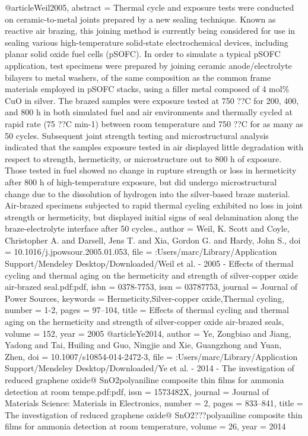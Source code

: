 @article{Weil2005,
abstract = {Thermal cycle and exposure tests were conducted on ceramic-to-metal joints prepared by a new sealing technique. Known as reactive air brazing, this joining method is currently being considered for use in sealing various high-temperature solid-state electrochemical devices, including planar solid oxide fuel cells (pSOFC). In order to simulate a typical pSOFC application, test specimens were prepared by joining ceramic anode/electrolyte bilayers to metal washers, of the same composition as the common frame materials employed in pSOFC stacks, using a filler metal composed of 4 mol{\%} CuO in silver. The brazed samples were exposure tested at 750 ??C for 200, 400, and 800 h in both simulated fuel and air environments and thermally cycled at rapid rate (75 ??C min-1) between room temperature and 750 ??C for as many as 50 cycles. Subsequent joint strength testing and microstructural analysis indicated that the samples exposure tested in air displayed little degradation with respect to strength, hermeticity, or microstructure out to 800 h of exposure. Those tested in fuel showed no change in rupture strength or loss in hermeticity after 800 h of high-temperature exposure, but did undergo microstructural change due to the dissolution of hydrogen into the silver-based braze material. Air-brazed specimens subjected to rapid thermal cycling exhibited no loss in joint strength or hermeticity, but displayed initial signs of seal delamination along the braze-electrolyte interface after 50 cycles.},
author = {Weil, K. Scott and Coyle, Christopher A. and Darsell, Jens T. and Xia, Gordon G. and Hardy, John S.},
doi = {10.1016/j.jpowsour.2005.01.053},
file = {:Users/marc/Library/Application Support/Mendeley Desktop/Downloaded/Weil et al. - 2005 - Effects of thermal cycling and thermal aging on the hermeticity and strength of silver-copper oxide air-brazed seal.pdf:pdf},
isbn = {0378-7753},
issn = {03787753},
journal = {Journal of Power Sources},
keywords = {Hermeticity,Silver-copper oxide,Thermal cycling},
number = {1-2},
pages = {97--104},
title = {{Effects of thermal cycling and thermal aging on the hermeticity and strength of silver-copper oxide air-brazed seals}},
volume = {152},
year = {2005}
}
@article{Ye2014,
author = {Ye, Zongbiao and Jiang, Yadong and Tai, Huiling and Guo, Ningjie and Xie, Guangzhong and Yuan, Zhen},
doi = {10.1007/s10854-014-2472-3},
file = {:Users/marc/Library/Application Support/Mendeley Desktop/Downloaded/Ye et al. - 2014 - The investigation of reduced graphene oxide@ SnO2polyaniline composite thin films for ammonia detection at room tempe.pdf:pdf},
issn = {1573482X},
journal = {Journal of Materials Science: Materials in Electronics},
number = {2},
pages = {833--841},
title = {{The investigation of reduced graphene oxide@ SnO2???polyaniline composite thin films for ammonia detection at room temperature}},
volume = {26},
year = {2014}
}
